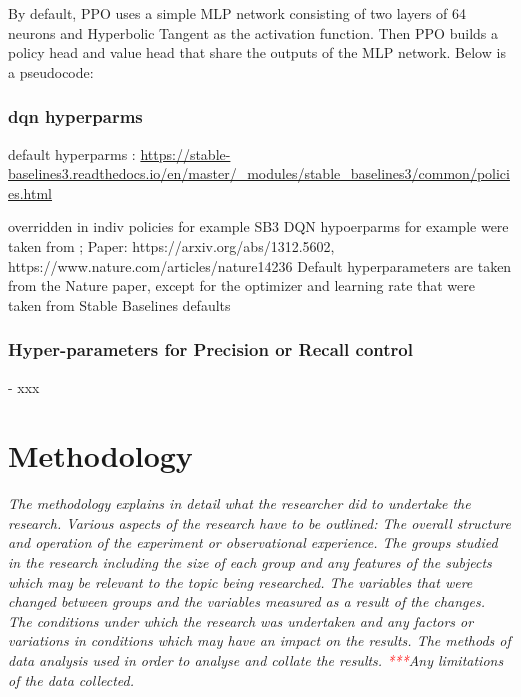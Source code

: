 \documentclass[a4paper, 12pt]{article}
\begin{document}
By default, PPO uses a simple MLP network consisting of two layers of 64 neurons and Hyperbolic Tangent as the activation function. Then PPO builds a policy head and value head that share the outputs of the MLP network. Below is a pseudocode:

\subsubsection{dqn hyperparms}


default hyperparms : \url{https://stable-baselines3.readthedocs.io/en/master/_modules/stable_baselines3/common/policies.html}

overridden in indiv policies for example 
SB3 DQN hypoerparms for example were taken from ;
Paper: https://arxiv.org/abs/1312.5602, https://www.nature.com/articles/nature14236
Default hyperparameters are taken from the Nature paper,
except for the optimizer and learning rate that were taken from Stable Baselines defaults



\subsubsection{Hyper-parameters for Precision or Recall control}
- xxx\\




\section{Methodology}\label{sec:Method}

\textit{The methodology explains in detail what the researcher did to undertake the research. Various aspects of the research have to be outlined: The overall structure and operation of the experiment or observational experience. The groups studied in the research including the size of each group and any features of the subjects which may be relevant to the topic being researched. The variables that were changed between groups and the variables measured as a result of the changes. The conditions under which the research was undertaken and any factors or variations in conditions which may have an impact on the results. The methods of data analysis used in order to analyse and collate the results. \textcolor{red}{***}Any limitations of the data collected.}
\end{document}
